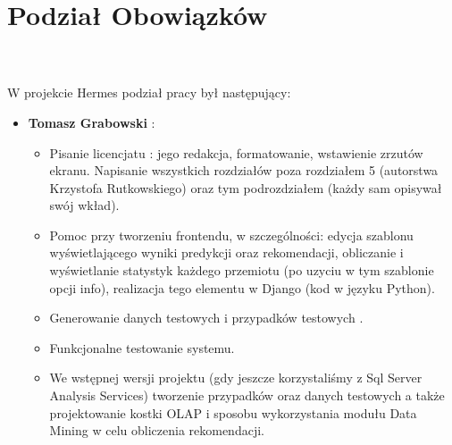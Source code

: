 \documentclass[licencjacka]{pracamgr}
\begin{document}
\section{Podział Obowiązków} ~\\

~\\ \indent W projekcie Hermes podział pracy był następujący:

\begin{itemize}
\item \textbf{Tomasz Grabowski} :
    \begin{itemize} 
    \item Pisanie licencjatu : jego redakcja, formatowanie, wstawienie zrzutów ekranu. Napisanie wszystkich rozdziałów poza rozdziałem 5 (autorstwa Krzystofa Rutkowskiego) oraz tym podrozdziałem (każdy sam opisywał swój wkład).
    \item Pomoc przy tworzeniu frontendu, w szczególności: edycja szablonu wyświetlającego wyniki predykcji oraz rekomendacji, obliczanie i wyświetlanie statystyk każdego przemiotu (po uzyciu w tym szablonie opcji info), realizacja tego elementu w Django (kod w języku Python). 
    \item Generowanie danych testowych i przypadków testowych .
    \item Funkcjonalne testowanie systemu. 
    \item We wstępnej wersji projektu (gdy jeszcze korzystaliśmy z Sql Server Analysis Services) tworzenie przypadków oraz danych testowych a także projektowanie kostki OLAP i sposobu wykorzystania modułu Data Mining w celu obliczenia rekomendacji.
    \end{itemize}


\end{itemize}
\end{document}
